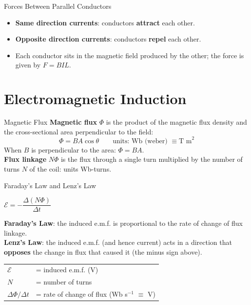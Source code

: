 \begin{keybox}{Forces Between Parallel Conductors}
\begin{itemize}[itemsep=2pt]
  \item \textbf{Same direction currents}: conductors \textbf{attract} each other.
  \item \textbf{Opposite direction currents}: conductors \textbf{repel} each other.
  \item Each conductor sits in the magnetic field produced by the other; the force is given by $F = BIL$.
\end{itemize}
\end{keybox}

\section{Electromagnetic Induction}

\begin{definitionbox}{Magnetic Flux}
\textbf{Magnetic flux} $\Phi$ is the product of the magnetic flux density and the cross-sectional area perpendicular to the field:
$$\Phi = BA\cos\theta \qquad \text{units: Wb (weber) } \equiv \text{T m}^2$$
When $B$ is perpendicular to the area: $\Phi = BA$.\\[0.3em]
\textbf{Flux linkage} $N\Phi$ is the flux through a single turn multiplied by the number of turns $N$ of the coil: units Wb-turns.
\end{definitionbox}

\begin{formulabox}{Faraday's Law and Lenz's Law}
\begin{center}
\large $\mathcal{E} = -\dfrac{\Delta(N\Phi)}{\Delta t}$
\end{center}
\vspace{0.3em}
\textbf{Faraday's Law}: the induced e.m.f. is proportional to the rate of change of flux linkage.\\[0.3em]
\textbf{Lenz's Law}: the induced e.m.f. (and hence current) acts in a direction that \textbf{opposes} the change in flux that caused it (the minus sign above).
\vspace{0.3em}
\begin{tabular}{@{}ll@{}}
$\mathcal{E}$ & = induced e.m.f. (V) \\
$N$ & = number of turns \\
$\Delta\Phi/\Delta t$ & = rate of change of flux (Wb s$^{-1}$ $\equiv$ V) \\
\end{tabular}
\end{formulabox}

